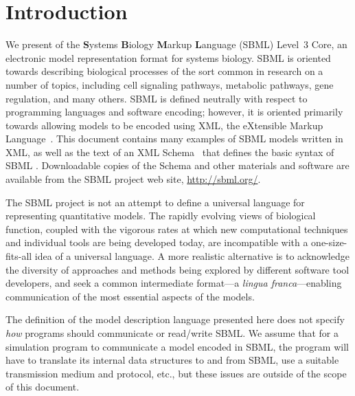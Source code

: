 
\section{Introduction}
\label{sec:introduction}

We present \thisVnum of the \textbf{S}ystems \textbf{B}iology
\textbf{M}arkup \textbf{L}anguage (SBML) Level~3 Core, an
electronic model representation format for systems biology.  SBML
is oriented towards describing biological processes of the sort
common in research on a number of topics, including cell signaling
pathways, metabolic pathways, gene regulation, and many others.
SBML is defined neutrally with respect to programming languages
and software encoding; however, it is oriented primarily towards
allowing models to be encoded using XML, the eXtensible Markup
Language~\citep{bray:2000}.  This document contains many examples
of SBML models written in XML, as well as the text of an XML
Schema~\citep{biron:2000,fallside:2000,thompson:2000} that defines
the basic syntax of SBML \thisLV.  Downloadable copies of the
Schema and other materials and software are available from the
SBML project web site, \url{http://sbml.org/}.

The SBML project is not an attempt to define a universal language
for representing quantitative models.  The rapidly evolving views
of biological function, coupled with the vigorous rates at which
new computational techniques and individual tools are being
developed today, are incompatible with a one-size-fits-all idea of
a universal language. A more realistic alternative is to
acknowledge the diversity of approaches and methods being explored
by different software tool developers, and seek a common
intermediate format---a \emph{lingua franca}---enabling
communication of the most essential aspects of the models.

The definition of the model description language presented here
does not specify \emph{how} programs should communicate or
read/write SBML.  We assume that for a simulation program to
communicate a model encoded in SBML, the program will have to
translate its internal data structures to and from SBML, use a
suitable transmission medium and protocol, etc., but these issues
are outside of the scope of this document.


